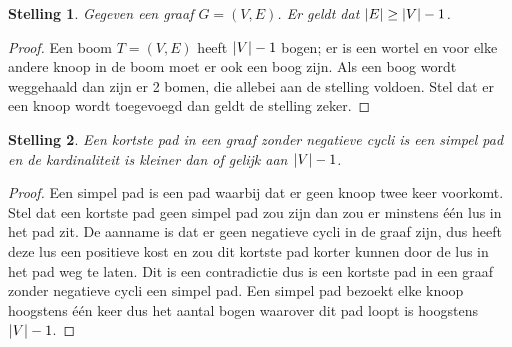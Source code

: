 \documentclass[conference]{IEEEtran}
\newtheorem{theorem}{Stelling}[section]
\theoremstyle{definition}
\theoremstyle{remark}
\DeclarePairedDelimiter{\card}{\vert}{\vert}  %
\begin{document}
\printbibliography

\appendix \label{appendix:stellingen}
\begin{theorem}
    Gegeven een graaf $G = (V, E)$. Er geldt dat $\card{E} \geq \card{V} - 1$.
\end{theorem}
\begin{proof}
    Een boom $T = (V, E)$ heeft $\card{V} - 1$ bogen; er is een wortel en voor elke andere knoop in de boom moet er ook een boog zijn. Als een boog wordt weggehaald dan zijn er 2 bomen, die allebei aan de stelling voldoen. Stel dat er een knoop wordt toegevoegd dan geldt de stelling zeker.
\end{proof}
\begin{theorem} \label{appendix:amountOfEdgesInShortestPath}
    Een kortste pad in een graaf zonder negatieve cycli is een simpel pad en de kardinaliteit is kleiner dan of gelijk aan $\card{V} - 1$.
\end{theorem}
\begin{proof}
    Een simpel pad is een pad waarbij dat er geen knoop twee keer voorkomt. Stel dat een kortste pad geen simpel pad zou zijn dan zou er minstens één lus in het pad zit. De aanname is dat er geen negatieve cycli in de graaf zijn, dus heeft deze lus een positieve kost en zou dit kortste pad korter kunnen door de lus in het pad weg te laten. Dit is een contradictie dus is een kortste pad in een graaf zonder negatieve cycli een simpel pad. Een simpel pad bezoekt elke knoop hoogstens één keer dus het aantal bogen waarover dit pad loopt is hoogstens $\card{V} - 1$.
\end{proof}
\end{document}
